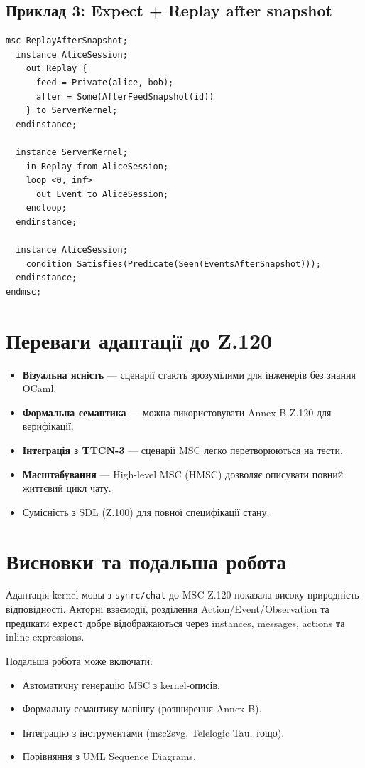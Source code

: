 \documentclass{article}
\begin{document}
\subsection{Приклад 3: Expect + Replay after snapshot}

\begin{lstlisting}[language={},basicstyle=\ttfamily\small]
msc ReplayAfterSnapshot;
  instance AliceSession;
    out Replay {
      feed = Private(alice, bob);
      after = Some(AfterFeedSnapshot(id))
    } to ServerKernel;
  endinstance;

  instance ServerKernel;
    in Replay from AliceSession;
    loop <0, inf>
      out Event to AliceSession;
    endloop;
  endinstance;

  instance AliceSession;
    condition Satisfies(Predicate(Seen(EventsAfterSnapshot)));
  endinstance;
endmsc;
\end{lstlisting}

\section{Переваги адаптації до Z.120}

\begin{itemize}
    \item \textbf{Візуальна ясність} — сценарії стають зрозумілими для інженерів без знання OCaml.
    \item \textbf{Формальна семантика} — можна використовувати Annex B Z.120 для верифікації.
    \item \textbf{Інтеграція з TTCN-3} — сценарії MSC легко перетворюються на тести.
    \item \textbf{Масштабування} — High-level MSC (HMSC) дозволяє описувати повний життєвий цикл чату.
    \item Сумісність з SDL (Z.100) для повної специфікації стану.
\end{itemize}

\section{Висновки та подальша робота}

Адаптація kernel-мовы з \texttt{synrc/chat} до MSC Z.120 показала високу природність відповідності. Акторні взаємодії, розділення Action/Event/Observation та предикати \texttt{expect} добре відображаються через instances, messages, actions та inline expressions.

Подальша робота може включати:
\begin{itemize}
    \item Автоматичну генерацію MSC з kernel-описів.
    \item Формальну семантику мапінгу (розширення Annex B).
    \item Інтеграцію з інструментами (msc2svg, Telelogic Tau, тощо).
    \item Порівняння з UML Sequence Diagrams.
\end{itemize}
\end{document}
